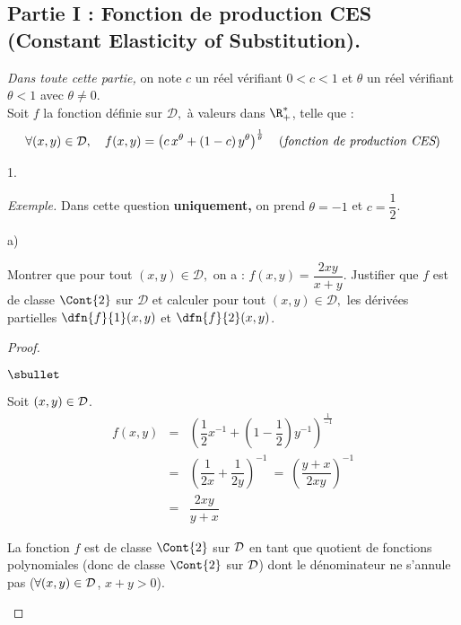\documentclass[11pt]{article}%
\begin{document}
\subsection*{Partie I : Fonction de production CES (Constant Elasticity 
of Substitution).}

\noindent
{\it Dans toute cette partie,} on note $c$ un réel vérifiant $0<c<1$ et 
$\theta$ un réel vérifiant $\theta < 1$ avec $\theta \neq 0.$\\
Soit $f$ la fonction définie sur $\mathcal{D},$ à valeurs dans 
$\R_+^*$, telle que :
\[
\forall (x,y)\in \mathcal{D},\quad 
f(x,y)=\left(c \, x^\theta+(1-c) \, y^\theta\right)^{\frac{1}{\theta}} 
\quad \text{({\it fonction de production CES})}
\]
\begin{noliste}{1.}
 \setlength{\itemsep}{4mm}
 \item {\it Exemple.} Dans cette question \textbf{uniquement,} on prend 
 $\theta=-1$ et $c=\dfrac{1}{2}$.
 \begin{noliste}{a)}
  \setlength{\itemsep}{2mm}
  \item Montrer que pour tout $(x,y) \in \mathcal{D},$ on a : $f(x,y) = 
  \dfrac{2xy}{x+y}$. Justifier que $f$ est de classe $\Cont{2}$ sur 
  $\mathcal{D}$ et calculer pour tout $(x,y) \in \mathcal{D},$ les 
  dérivées partielles $\dfn{f}{1}(x,y)$ et $\dfn{f}{2}(x,y)$.
  
  \begin{proof}~
   \begin{noliste}{$\sbullet$}
    \item Soit $(x,y) \in {\cal D}$.
    \[
     \begin{array}{rcl}
      f(x,y) &=& \left( \dfrac{1}{2} x^{-1} + \left(1-\dfrac{1}{2}
      \right) y^{-1}\right)^{\frac{1}{-1}}
      \\[.6cm]
      &=& \left( \dfrac{1}{2x} + \dfrac{1}{2y} \right)^{-1}
      \ = \ \left(\dfrac{y+x}{2xy}\right)^{-1}
      \\[.6cm]
      &=& \dfrac{2xy}{y+x}
     \end{array}
    \]
    
    \item La fonction $f$ est de classe $\Cont{2}$ sur ${\cal D}$
    en tant que quotient de fonctions polynomiales (donc de 
    classe $\Cont{2}$ sur ${\cal D}$) dont le dénominateur ne 
    s'annule pas ($\forall (x,y) \in {\cal D}$, $x+y>0$).
    

\end{noliste}
\end{proof}
\end{noliste}
\end{noliste}
\end{document}
